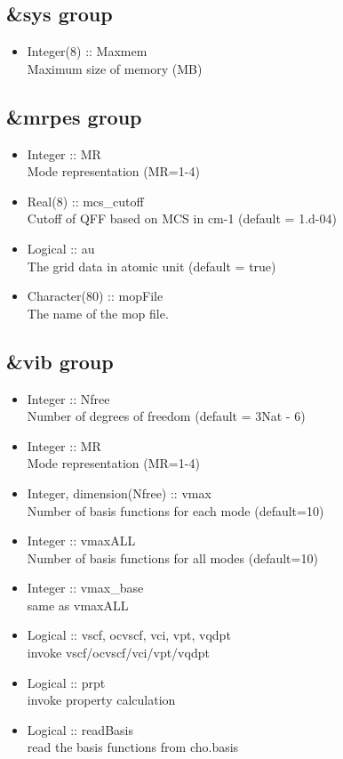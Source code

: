 \documentclass[a4paper,12pt]{article}
\begin{document}
\subsection{\&sys group}
   \begin{itemize}
     \item Integer(8) :: Maxmem \\
       Maximum size of memory (MB)
   \end{itemize}

\subsection{\&mrpes group}
   \begin{itemize}
     \item Integer :: MR \\
       Mode representation (MR=1-4)
     \item Real(8) :: mcs\_cutoff \\
       Cutoff of QFF based on MCS in cm-1 (default = 1.d-04)
     \item Logical :: au \\
       The grid data in atomic unit (default = true)
     \item Character(80) :: mopFile \\
       The name of the mop file.
   \end{itemize}

\subsection{\&vib group}
   \begin{itemize}
     \item Integer :: Nfree \\
       Number of degrees of freedom (default = 3Nat - 6)
     \item Integer :: MR \\
       Mode representation (MR=1-4)
     \item Integer, dimension(Nfree) :: vmax \\
       Number of basis functions for each mode (default=10)
     \item Integer :: vmaxALL \\
       Number of basis functions for all modes (default=10)
     \item Integer :: vmax\_base \\
       same as vmaxALL
     \item Logical :: vscf, ocvscf, vci, vpt, vqdpt \\
       invoke vscf/ocvscf/vci/vpt/vqdpt
     \item Logical :: prpt \\
       invoke property calculation 
     \item Logical :: readBasis \\
       read the basis functions from cho.basis
   \end{itemize}
\end{document}

